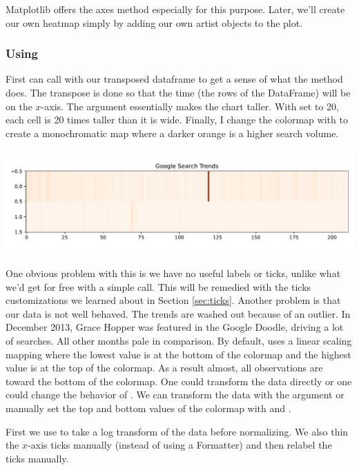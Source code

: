 Matplotlib offers the  axes method especially for this purpose. Later, we'll create our own heatmap simply by adding our own artist objects to the plot. 

\subsubsection{Using }

First can call  with our transposed dataframe to get a sense of what the method does. The transpose is done so that the time (the rows of the DataFrame) will be on the $x$-axis. The  argument essentially makes the chart taller. With  set to 20, each cell is 20 times taller than it is wide. Finally, I change the colormap with  to create a monochromatic map where a darker orange is a higher search volume. 


\begin{center}
    \includegraphics[width = .8\textwidth]{figures/poetryplots/heat-basic.pdf}
\end{center}

One obvious problem with this is we have no useful labels or ticks, unlike what we'd get for free with a simple  call. This will be remedied with the ticks customizations we learned about in Section \ref{sec:ticks}. Another problem is that our data is not well behaved. The trends are washed out because of an outlier. In December 2013, Grace Hopper was featured in the Google Doodle, driving a lot of searches. All other months pale in comparison. By default,  uses a linear scaling mapping where the lowest value is at the bottom of the colormap and the highest value is at the top of the colormap. As a result almost, all observations are toward the bottom of the colormap. One could transform the data directly or one could change the behavior of . We can transform the data with the  argument or manually set the top and bottom values of the colormap with  and . 

First we use  to take a log transform of the data before normalizing. We also thin the $x$-axis ticks manually (instead of using a Formatter) and then relabel the ticks manually. 

